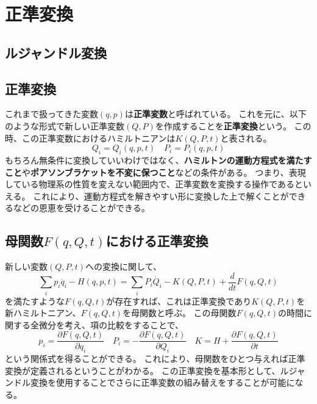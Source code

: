 \documentclass[a4paper]{jsreport}
\begin{document}
    \chapter{正準変換}
        \section{ルジャンドル変換}
        \section{正準変換}
            これまで扱ってきた変数$(q, p)$は\textbf{正準変数}と呼ばれている。
            これを元に、以下のような形式で新しい正準変数$(Q, P)$を作成することを\textbf{正準変換}という。
            この時、この正準変数におけるハミルトニアンは$K(Q, P, t)$と表される。
            \begin{equation}
                Q_i = Q_i(q, p, t) \quad P_i = P_i(q, p, t)
            \end{equation}
            もちろん無条件に変換していいわけではなく、\textbf{ハミルトンの運動方程式を満たすこと}や\textbf{ポアソンブラケットを不変に保つこと}などの条件がある。
            つまり、表現している物理系の性質を変えない範囲内で、正準変数を変換する操作であるといえる。
            これにより、運動方程式を解きやすい形に変換した上で解くことができるなどの恩恵を受けることができる。

        \section{母関数$F(q, Q, t)$における正準変換}
            新しい変数$(Q, P, t)$への変換に関して、
            \begin{equation}
                \sum_{i} p_i \dot{q_i} - H(q, p, t) = \sum_{i} P_i \dot{Q_i} - K(Q, P, t) + \frac{d}{dt} F(q, Q, t)
            \end{equation}
            を満たすような$F(q, Q, t)$が存在すれば、これは正準変換であり$K(Q, P, t)$を新ハミルトニアン、$F(q, Q, t)$を母関数と呼ぶ。
            この母関数$F(q, Q, t)$の時間に関する全微分を考え、項の比較をすることで、
            \begin{equation} \label{eq:5a}
                p_i = \frac{\partial F(q, Q, t)}{\partial q_i} \quad P_i = - \frac{\partial F(q, Q, t)}{\partial Q_i} \quad K = H + \frac{\partial F(q, Q, t)}{\partial t}
            \end{equation}
            という関係式を得ることができる。
            これにより、母関数をひとつ与えれば正準変換が定義されるということがわかる。
            この正準変換を基本形として、ルジャンドル変換を使用することでさらに正準変数の組み替えをすることが可能になる。
\end{document}
